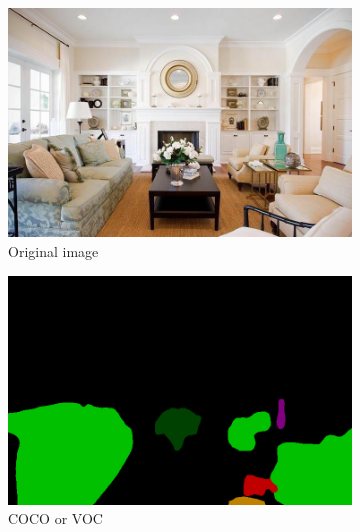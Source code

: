 \documentclass[12pt,a4paper,table,dvipsnames,tikz]{report}
\newcommand{\acronym}{\MakeUppercase}
\begin{document}
	\begin{figure}[h!]
		\caption{Results given from indoor input. Fully convolutional network, Pyramid 
		scene parsing network and DeepLab trained on \acronym{coco}, \acronym{pascal voc} 
		and \acronym{ade20k} dataset.}
		\centering
		\begin{subfigure}[b]{0.3\textwidth}
			\includegraphics[width=\textwidth]{in}
			\caption{Original image}
		\end{subfigure}
		\begin{subfigure}[b]{0.3\textwidth}
			\includegraphics[width=\textwidth]{in_coco_voc}
			\caption{\acronym{coco} or \acronym{voc}}
		\end{subfigure}
		\\
		\begin{subfigure}[b]{0.3\textwidth}

\end{subfigure}
\end{figure}
\end{document}
